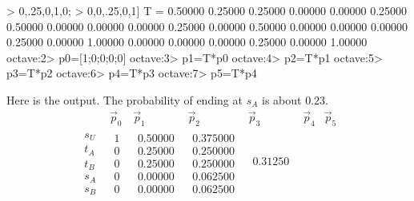 \begin{ans}{4}
\begin{exparts}
\begin{computercode}
>            0,.25,0,1,0;
>            0,0,.25,0,1]
T =
  0.50000  0.25000  0.25000  0.00000  0.00000
  0.25000  0.50000  0.00000  0.00000  0.00000
  0.25000  0.00000  0.50000  0.00000  0.00000
  0.00000  0.25000  0.00000  1.00000  0.00000
  0.00000  0.00000  0.25000  0.00000  1.00000
octave:2> p0=[1;0;0;0;0]
octave:3> p1=T*p0
octave:4> p2=T*p1
octave:5> p3=T*p2
octave:6> p4=T*p3
octave:7> p5=T*p4
\end{computercode}
        Here is the output.
        The probability of ending at $s_A$ is about $0.23$.
        \begin{equation*}
          \begin{array}{cc|ccccc}
            &\vec{p}_0 &\vec{p}_1 &\vec{p}_2 &\vec{p}_3
                &\vec{p}_4 &\vec{p}_5 \\
            \hline
            \begin{array}{c}
              s_U \\
              t_A \\
              t_B \\
              s_A \\
              s_B
            \end{array}
            &\begin{array}{c}
               1 \\
               0 \\
               0 \\
               0 \\
               0
            \end{array}
            &\begin{array}{c}
              0.50000 \\
              0.25000 \\
              0.25000 \\
              0.00000 \\
              0.00000
            \end{array}
            &\begin{array}{c}
              0.375000 \\
              0.250000 \\
              0.250000 \\
              0.062500 \\
              0.062500
            \end{array}
            &\begin{array}{c}
              0.31250 \\

\end{array}
\end{array}
\end{equation*}
\end{exparts}
\end{ans}
